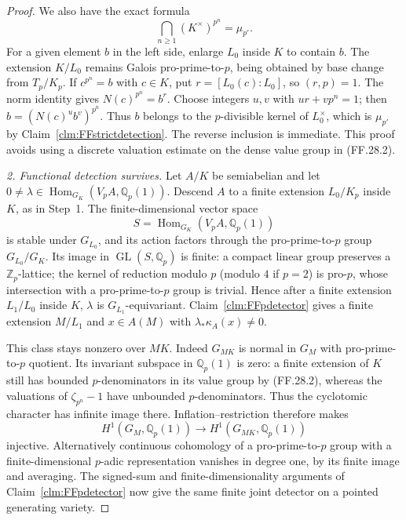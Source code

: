 \begin{proof}
We also have the exact formula
\[
       \bigcap_{n\geq1}(K^\times)^{p^n}=\mu_{p'}.
                                                        \tag{FF.28.3}
\]
For a given element \(b\) in the left side, enlarge
\(L_0\) inside \(K\) to contain \(b\). The extension
\(K/L_0\) remains Galois pro-prime-to-\(p\), being
obtained by base change from \(T_p/K_p\). If
\(c^{p^n}=b\) with \(c\in K\), put
\(r=[L_0(c):L_0]\), so \((r,p)=1\). The norm
identity gives \(N(c)^{p^n}=b^r\). Choose integers
\(u,v\) with \(ur+vp^n=1\); then
\(b=(N(c)^u b^v)^{p^n}\). Thus \(b\) belongs to
the \(p\)-divisible kernel of \(L_0^\times\),
which is \(\mu_{p'}\) by Claim~\ref{clm:FFstrictdetection}.
The reverse inclusion is immediate. This proof
avoids using a discrete valuation estimate on the
dense value group in (FF.28.2).

\emph{2. Functional detection survives.}
Let \(A/K\) be semiabelian and let
\(0\ne\lambda\in\operatorname{Hom}_{G_K}
(V_pA,\mathbb Q_p(1))\). Descend \(A\) to a
finite extension \(L_0/K_p\) inside \(K\),
as in Step~1. The finite-dimensional vector space
\[
 S=\operatorname{Hom}_{G_K}(V_pA,\mathbb Q_p(1))
\]
is stable under \(G_{L_0}\), and its action factors
through the pro-prime-to-\(p\) group
\(G_{L_0}/G_K\). Its image in
\(\operatorname{GL}(S,\mathbb Q_p)\) is finite:
a compact linear group preserves a \(\mathbb Z_p\)-lattice;
the kernel of reduction modulo \(p\) (modulo \(4\)
if \(p=2\)) is pro-\(p\), whose intersection with
a pro-prime-to-\(p\) group is trivial. Hence after
a finite extension \(L_1/L_0\) inside \(K\),
\(\lambda\) is \(G_{L_1}\)-equivariant.
Claim~\ref{clm:FFpdetector} gives a finite extension
\(M/L_1\) and \(x\in A(M)\) with
\(\lambda_*\kappa_A(x)\ne0\).

This class stays nonzero over \(MK\). Indeed
\(G_{MK}\) is normal in \(G_M\) with
pro-prime-to-\(p\) quotient. Its invariant subspace
in \(\mathbb Q_p(1)\) is zero: a finite extension
of \(K\) still has bounded \(p\)-denominators in
its value group by (FF.28.2), whereas the valuations
of \(\zeta_{p^n}-1\) have unbounded
\(p\)-denominators. Thus the cyclotomic character
has infinite image there. Inflation--restriction
therefore makes
\[
 H^1(G_M,\mathbb Q_p(1))\longrightarrow
 H^1(G_{MK},\mathbb Q_p(1))
\]
injective. Alternatively continuous cohomology of
a pro-prime-to-\(p\) group with a finite-dimensional
\(p\)-adic representation vanishes in degree one,
by its finite image and averaging. The signed-sum
and finite-dimensionality arguments of
Claim~\ref{clm:FFpdetector} now give the same finite
joint detector on a pointed generating variety.


\end{proof}
